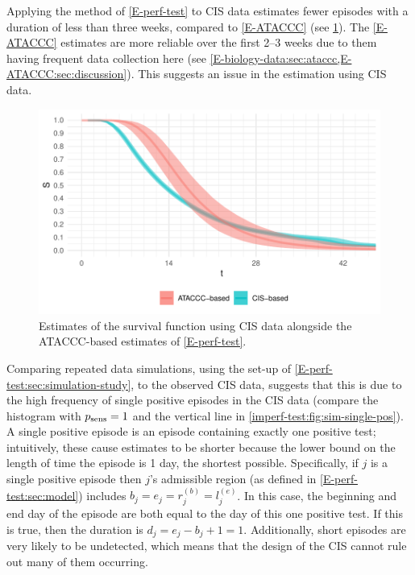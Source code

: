 \documentclass[thesis.tex]{subfiles}
\begin{document}
Applying the method of \cref{E-perf-test} to CIS data estimates fewer episodes with a duration of less than three weeks, compared to \cref{E-ATACCC} (see \cref{imperf-test:fig:problem-cis-estimates}).
The \cref{E-ATACCC} estimates are more reliable over the first 2--3 weeks due to them having frequent data collection here (see \cref{E-biology-data:sec:ataccc,E-ATACCC:sec:discussion}).
This suggests an issue in the estimation using CIS data.
\begin{figure}
  \centering \includegraphics{cis-imperfect-testing/CIS_perfect}
  \caption[Estimating survival using CIS data assuming perfect testing]{Estimates of the survival function using CIS data alongside the ATACCC-based estimates of \cref{E-perf-test}. \label{imperf-test:fig:problem-cis-estimates}}
\end{figure}

Comparing repeated data simulations, using the set-up of \cref{E-perf-test:sec:simulation-study}, to the observed CIS data, suggests that this is due to the high frequency of single positive episodes in the CIS data (compare the histogram with $p_\text{sens}=1$ and the vertical line in \cref{imperf-test:fig:sim-single-pos}).
A single positive episode is an episode containing exactly one positive test; intuitively, these cause estimates to be shorter because the lower bound on the length of time the episode is 1 day, the shortest possible.
Specifically, if $j$ is a single positive episode then $j$'s admissible region (as defined in \cref{E-perf-test:sec:model}) includes $b_j = e_j = r_j^{(b)} = l_j^{(e)}$.
In this case, the beginning and end day of the episode are both equal to the day of this one positive test.
If this is true, then the duration is $d_j = e_j - b_j + 1 = 1$.
Additionally, short episodes are very likely to be undetected, which means that the design of the CIS cannot rule out many of them occurring.
\end{document}
